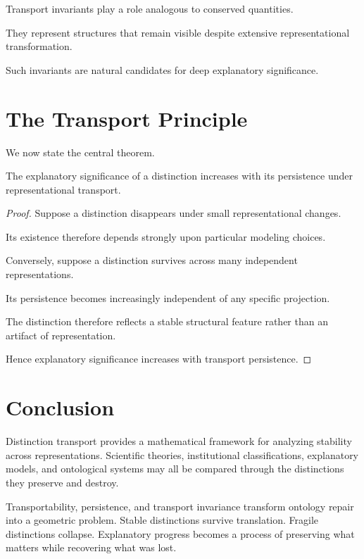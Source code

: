 \documentclass[11pt,oneside,openany]{book}
\begin{document}
Transport invariants play a role analogous to conserved quantities.

They represent structures that remain visible despite extensive representational transformation.

Such invariants are natural candidates for deep explanatory significance.

\section{The Transport Principle}

We now state the central theorem.

\begin{theorem}

The explanatory significance of a distinction increases with its persistence under representational transport.

\end{theorem}

\begin{proof}

Suppose a distinction disappears under small representational changes.

Its existence therefore depends strongly upon particular modeling choices.

Conversely, suppose a distinction survives across many independent representations.

Its persistence becomes increasingly independent of any specific projection.

The distinction therefore reflects a stable structural feature rather than an artifact of representation.

Hence explanatory significance increases with transport persistence.

\end{proof}

\section{Conclusion}

Distinction transport provides a mathematical framework for analyzing stability across representations. Scientific theories, institutional classifications, explanatory models, and ontological systems may all be compared through the distinctions they preserve and destroy.

Transportability, persistence, and transport invariance transform ontology repair into a geometric problem. Stable distinctions survive translation. Fragile distinctions collapse. Explanatory progress becomes a process of preserving what matters while recovering what was lost.
\end{document}
